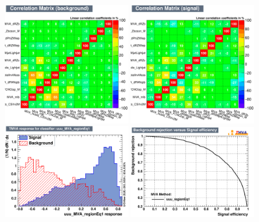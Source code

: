 \begin{figure}[htbp]
	\includegraphics[width=0.48\textwidth]{6_Search/Figures/MVAtechnics/toppairzct/uuu/CorrelationMatrixB.png}
	\includegraphics[width=0.48\textwidth]{6_Search/Figures/MVAtechnics/toppairzct/uuu/CorrelationMatrixS.png}
	\includegraphics[width=0.48\textwidth]{6_Search/Figures/MVAtechnics/toppairzct/uuu/mva_uuu_MVA_regionEq1.png}
	\includegraphics[width=0.48\textwidth]{6_Search/Figures/MVAtechnics/toppairzct/uuu/rejBvsS.png}

\end{figure}
